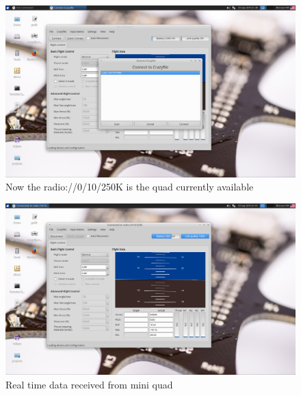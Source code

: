 \documentclass[11pt]{article}
\begin{document}
\begin{figure}[h]
\includegraphics[width=\linewidth]{radioconnect.png}
\caption{Now the radio://0/10/250K is the quad currently available}
\label{fig:radioconnect}
\end{figure}

\begin{figure}[h]
\includegraphics[width=\linewidth]{connectedquad.png}
\caption{Real time data received from mini quad}
\label{fig:connectedquad}
\end{figure}
\end{document}
